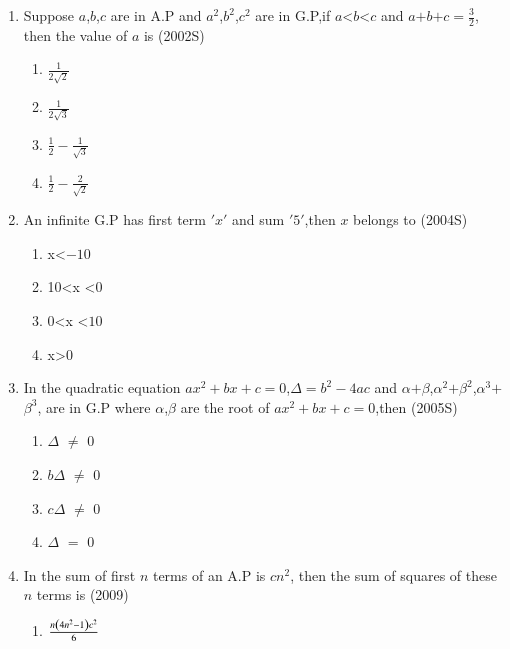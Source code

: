\documentclass[journal,12pt,twocolumn]{IEEEtran}
\theoremstyle{remark}
\begin{document}
\begin{enumerate} [start=5]
    \hfill(2001S)
    \begin{enumerate}
        \item $10$
        \item $12$
        \item $11$
        \item $13$
    \end{enumerate}
    \item  Suppose $a$,$b$,$c$ are in A.P and $a^2$,$b^2$,$c^2$ are in G.P,if $a$\textless$b$\textless$c$ and $a$$+$$b$$+$$c$$=$$\frac{3}{2}$, then the value of $a$ is 
    \hfill(2002S)
    \begin{enumerate}
        \item $\frac{1}{2\sqrt{2}}$
        \item $\frac{1}{2\sqrt{3}}$
        \item $\frac{1}{2}-\frac{1}{\sqrt{3}}$
        \item $\frac{1}{2}-\frac{2}{\sqrt{2}}$
    \end{enumerate}
    \item An infinite G.P has first term $'x'$ and sum $'5'$,then $x$ belongs to 
    \hfill(2004S)
    \begin{enumerate}
        \item x\textless$-10$
        \item 10\textless x \textless$0$
        \item $0$\textless x \textless$10$
        \item x\textgreater$0$
    \end{enumerate}
    \item In the quadratic equation $ax^2+bx+c$$=$$0$,$\Delta$$=$$b^2-4ac$ and $\alpha$$+$$\beta$,$\alpha^2$$+$$\beta^2$,$\alpha^3$$+$$\beta^3$, are in G.P where $\alpha$,$\beta$ are the root of $ax^2+bx+c$$=$$0$,then
    \hfill(2005S)
    \begin{enumerate}
        \item $\Delta$ $\neq$ $0$
        \item $b\Delta$ $\neq$ $0$
        \item $c\Delta$ $\neq$ $0$
        \item $\Delta$ $=$ $0$
    \end{enumerate}
    \item In the sum of first $n$ terms of an A.P is $cn^2$, then the sum of squares of these $n$  terms is 
    \hfill(2009)
    \begin{enumerate}
        \item $\frac{n\left(4n^2-1\right)c^2}{6}$

\end{enumerate}
\end{enumerate}
\end{document}
